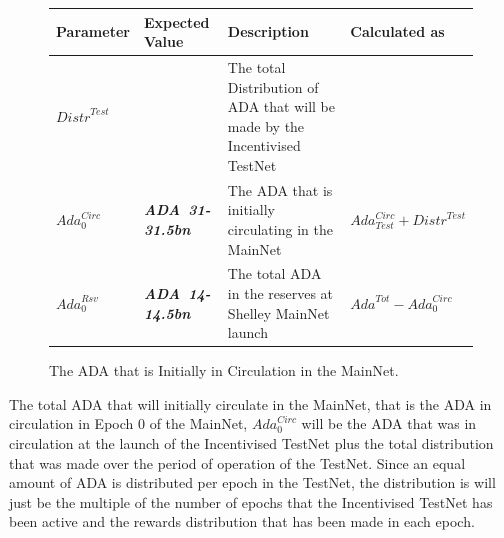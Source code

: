 \documentclass[11pt,a4paper,dvipsnames,twosided,final]{article}
\newcommand{\ada}{ADA{}}
\newcommand{\ADA}[1]{\textbf{\emph{\ada~{#1}}}}
\begin{document}
\clearpage
\begin{figure}[h!]
\begin{center}
\begin{tabular}{||l|l|p{6cm}|l||}
  \hline \hline
\textbf{Parameter} & \textbf{Expected Value} & \textbf{Description} & \textbf{Calculated as} \\\hline
${\textit{Distr}}^{Test}$ & & The total Distribution of \ada{} that will be made by the Incentivised TestNet & \\\hline
$\textit{Ada}^{\textit{Circ}}_{0}$ & \ADA{31-31.5bn} & The \ada{} that is initially circulating in the MainNet & $\textit{Ada}^{\textit{Circ}}_{\textit{Test}} + {\textit{Distr}}^{\textit{Test}}$ \\\hline
$\textit{Ada}^{\textit{Rsv}}_{0}$ & \ADA{14-14.5bn} & The total \ada{} in the reserves at Shelley MainNet launch & $\textit{Ada}^{Tot} - \textit{Ada}^{\textit{Circ}}_{0}$ \\\hline
\hline
\end{tabular}
\end{center}
\caption{The \ada{} that is Initially in Circulation in the MainNet.}
\end{figure}

\noindent
The total \ada{} that will initially circulate in the MainNet, that is the \ada{} in circulation in Epoch 0 of the MainNet,
$\textit{Ada}^{\textit{Circ}}_{0}$ will be the \ada{} that was in circulation at the launch of the Incentivised
TestNet plus the total distribution that was made over the period of operation of the TestNet.
Since an equal amount of \ada{} is distributed per epoch in
the TestNet,
the distribution is will just be the multiple of the number of epochs that the Incentivised TestNet has
been active and the rewards distribution that has been made in each epoch.
\end{document}
